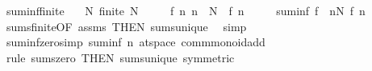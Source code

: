 \begin{isabellebody}
\endisatagproof
{\isafoldproof}%
%
\isadelimproof
\isanewline
%
\endisadelimproof
\isanewline
{}\isamarkupfalse%
\ suminf{\isacharunderscore}{\kern0pt}finite{\isacharcolon}{\kern0pt}\isanewline
\ \ \ N{\isacharcolon}{\kern0pt}\ {\isachardoublequoteopen}finite\ N{\isachardoublequoteclose}\isanewline
\ \ \ \ \ f{\isacharcolon}{\kern0pt}\ {\isachardoublequoteopen}{\isasymAnd}n{\isachardot}{\kern0pt}\ n\ {\isasymnotin}\ N\ {\isasymLongrightarrow}\ f\ n\ {\isacharequal}{\kern0pt}\ {}{\isachardoublequoteclose}\isanewline
\ \ \ {\isachardoublequoteopen}suminf\ f\ {\isacharequal}{\kern0pt}\ {\isacharparenleft}{\kern0pt}{\isasymSum}n{\isasymin}N{\isachardot}{\kern0pt}\ f\ n{\isacharparenright}{\kern0pt}{\isachardoublequoteclose}\isanewline
%
\isadelimproof
\ \ %
\endisadelimproof
%
\isatagproof
{}\isamarkupfalse%
\ sums{\isacharunderscore}{\kern0pt}finite{\isacharbrackleft}{\kern0pt}OF\ assms{\isacharcomma}{\kern0pt}\ THEN\ sums{\isacharunderscore}{\kern0pt}unique{\isacharbrackright}{\kern0pt}\ \isamarkupfalse%
\ simp%
\endisatagproof
{\isafoldproof}%
%
\isadelimproof
\isanewline
%
\endisadelimproof
\isanewline
{}\isamarkupfalse%
\isanewline
\isanewline
{}\isamarkupfalse%
\ suminf{\isacharunderscore}{\kern0pt}zero{\isacharbrackleft}{\kern0pt}simp{\isacharbrackright}{\kern0pt}{\isacharcolon}{\kern0pt}\ {\isachardoublequoteopen}suminf\ {\isacharparenleft}{\kern0pt}{\isasymlambda}n{\isachardot}{\kern0pt}\ {}{\isacharcolon}{\kern0pt}{\isacharcolon}{\kern0pt}{\isacharprime}{\kern0pt}a{\isacharcolon}{\kern0pt}{\isacharcolon}{\kern0pt}{\isacharbraceleft}{\kern0pt}t{}{\isacharunderscore}{\kern0pt}space{\isacharcomma}{\kern0pt}\ comm{\isacharunderscore}{\kern0pt}monoid{\isacharunderscore}{\kern0pt}add{\isacharbraceright}{\kern0pt}{\isacharparenright}{\kern0pt}\ {\isacharequal}{\kern0pt}\ {}{\isachardoublequoteclose}\isanewline
%
\isadelimproof
\ \ %
\endisadelimproof
%
\isatagproof
{}\isamarkupfalse%
\ {\isacharparenleft}{\kern0pt}rule\ sums{\isacharunderscore}{\kern0pt}zero\ {\isacharbrackleft}{\kern0pt}THEN\ sums{\isacharunderscore}{\kern0pt}unique{\isacharcomma}{\kern0pt}\ symmetric{\isacharbrackright}{\kern0pt}{\isacharparenright}{\kern0pt}%
\endisatagproof
{\isafoldproof}%
%
\isadelimproof
%
\endisadelimproof
%
\isadelimdocument
%
\endisadelimdocument
%
\isatagdocument
%
\isamarkuptrue%
%
\endisatagdocument

\end{isabellebody}
